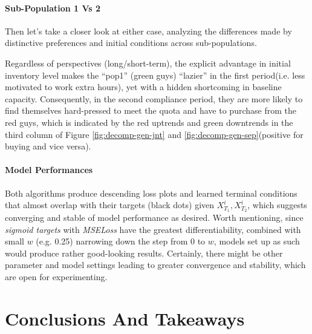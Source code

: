 \documentclass[a4paper,10pt]{article}
\newcommand{\1}{\mathbf{1}}
\begin{document}
\paragraph{Sub-Population 1 Vs 2}

Then let's take a closer look at either case, analyzing the differences
made by distinctive preferences and initial conditions across
sub-populations. 


Regardless of perspectives (long/short-term), the explicit advantage in initial inventory level makes the ``pop1'' (green guys) ``lazier'' in the first period(i.e. less motivated to work extra hours), yet with a hidden shortcoming in baseline capacity. Consequently, in the second compliance period, they are more likely to find themselves hard-pressed
to meet the quota and have to purchase from the red guys, which is
indicated by the red uptrends and green downtrends in the third column of Figure \ref{fig:decomp-gen-jnt} and \ref{fig:decomp-gen-sep}(positive for buying and vice versa).

\paragraph{Model Performances}

Both algorithms produce descending loss plots and learned terminal
conditions that almost overlap with their targets (black dots) given
\(X_{T_1}^i, X_{T_2}^i\), which suggests converging and stable
of model performance as desired. Worth mentioning, since \textit{sigmoid targets} with \textit{MSELoss} have the greatest differentiability, combined with small \(w\) (e.g. 0.25) narrowing down the step from 0 to \(w\), models set up as such would produce rather good-looking results. Certainly, there might be other parameter and model settings leading to greater
convergence and stability, which are open for experimenting.

\newpage  %
\section{Conclusions And Takeaways}
\end{document}
